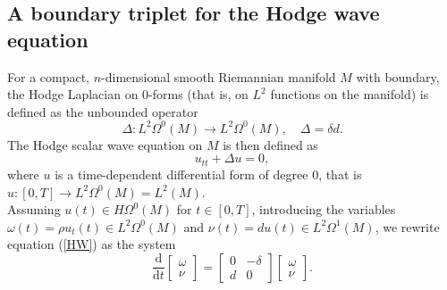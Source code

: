 \documentclass{ifacconf}
\newcommand{\drh}[2]{\Omega^{#2}(#1)}
\begin{document}
\subsection{A boundary triplet for the Hodge wave equation}
For a compact, $n$-dimensional smooth Riemannian manifold $M$ with boundary, the Hodge Laplacian on $0$-forms (that is, on $L^2$ functions on the manifold) is defined as the unbounded operator
\[
    \Delta: L^2\drh{M}{0}\to L^2 \drh{M}{0},\quad \Delta=\delta d.
\]
The Hodge scalar wave equation on $M$ is then defined as
\begin{equation}\label{HW}
  u_{tt} + \Delta u = 0,
\end{equation}
where $u$ is a time-dependent differential form of degree $0$, that is $u:[0,T]\rightarrow L^2\drh{M}{0}= L^2(M)$.\\
Assuming $u(t)\in H\drh{M}{0}$ for $t\in [0,T]$, introducing the variables $\omega(t)=\rho u_t(t)\in L^2\drh{M}{0}$ and $\nu(t)=du(t)\in L^2\drh{M}{1}$, we rewrite equation (\ref{HW}) as the system
\begin{equation}\label{HWsystem}
    \frac{\mathrm{d}}{\mathrm{d}t}\begin{bmatrix}
         \omega  \\
         \nu
    \end{bmatrix}=\begin{bmatrix}
        0 & -\delta \\
        d & 0  
    \end{bmatrix}%
        \begin{bmatrix}
         \omega  \\
         \nu
    \end{bmatrix}.
\end{equation}
\end{document}
